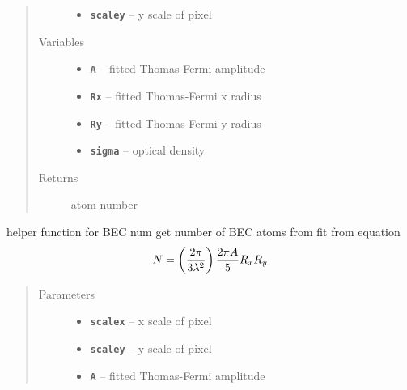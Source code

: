 \documentclass[letterpaper,10pt,english]{sphinxmanual}
\begin{document}
\begin{fulllineitems}
\begin{fulllineitems}
\begin{quote}
\begin{description}
\begin{itemize}
\item {} 
\textbf{\texttt{scaley}} -- y scale of pixel

\end{itemize}

\item[{Variables}] \leavevmode\begin{itemize}
\item {} 
\textbf{\texttt{A}} -- fitted Thomas-Fermi amplitude

\item {} 
\textbf{\texttt{Rx}} -- fitted Thomas-Fermi x radius

\item {} 
\textbf{\texttt{Ry}} -- fitted Thomas-Fermi y radius

\item {} 
\textbf{\texttt{sigma}} -- optical density

\end{itemize}

\item[{Returns}] \leavevmode
atom number

\end{description}\end{quote}

\end{fulllineitems}


\begin{fulllineitems}
\label{fit_object:Fitobject.fit_object.BEC_num_1}
helper function for BEC num
get number of BEC atoms from fit from equation
\begin{gather}
\begin{split}N = \left(\frac{2 \pi}{3\lambda^2}\right)\frac{2\pi A}{5}R_x R_y\end{split}\notag
\end{gather}\begin{quote}\begin{description}
\item[{Parameters}] \leavevmode\begin{itemize}
\item {} 
\textbf{\texttt{scalex}} -- x scale of pixel

\item {} 
\textbf{\texttt{scaley}} -- y scale of pixel

\item {} 
\textbf{\texttt{A}} -- fitted Thomas-Fermi amplitude


\end{itemize}
\end{description}
\end{quote}
\end{fulllineitems}
\end{fulllineitems}
\end{document}
